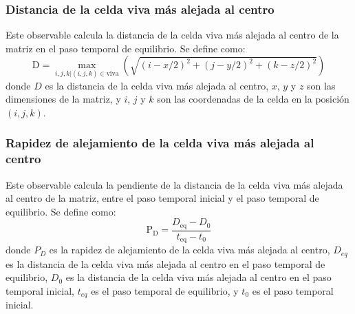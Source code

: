 \subsubsection{Distancia de la celda viva más alejada al centro}\label{subsubsec:distancia-de-la-celda-viva-mas-alejada-al-centro}
Este observable calcula la distancia de la celda viva más alejada al centro de la matriz
en el paso temporal de equilibrio.
Se define como:
\begin{equation}
    \text{D} = \max_{i, j, k | (i, j, k) \in \text{viva}} \left( \sqrt{(i - x/2)^2 + (j - y/2)^2 + (k - z/2)^2} \right)
    \label{eq:distancia-celda-viva-mas-alejada-al-centro}
\end{equation}
donde $D$ es la distancia de la celda viva más alejada al centro, $x$, $y$ y $z$ son las dimensiones de la matriz,
y $i$, $j$ y $k$ son las coordenadas de la celda en la posición $(i, j, k)$.

\subsubsection{Rapidez de alejamiento de la celda viva más alejada al centro}\label{subsubsec:rapidez-de-alejamiento-de-la-celda-viva-mas-alejada-al-centro}
Este observable calcula la pendiente de la distancia de la celda viva más alejada al centro de la matriz,
entre el paso temporal inicial y el paso temporal de equilibrio.
Se define como:
\begin{equation}
    \text{P}_{\text{D}} = \frac{D_{\text{eq}} - D_{0}}{t_{\text{eq}} - t_{0}}
    \label{eq:rapidez-alejamiento-celda-viva-mas-alejada-al-centro}
\end{equation}
donde $P_{D}$ es la rapidez de alejamiento de la celda viva más alejada al centro, $D_{eq}$ es la
distancia de la celda viva más alejada al centro en el paso temporal de equilibrio, $D_{0}$ es la
distancia de la celda viva más alejada al centro en el paso temporal inicial, $t_{eq}$ es el paso
temporal de equilibrio, y $t_{0}$ es el paso temporal inicial.









